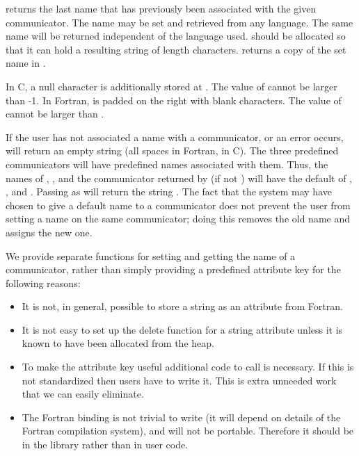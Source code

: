  returns the last name that has previously been
associated with the given communicator. The name may be set and retrieved
from any language. The same name will be returned independent of the
language used.
 should be allocated so that it can hold a resulting string
of length  characters.
returns a copy of the set name in .
 
In C, a null character is additionally stored at .
The value of  cannot be larger than
-1.
In Fortran,  is padded on the right with blank characters.
The value of  cannot be larger than
.

If the user has not associated a name with a communicator, or an error
occurs,  will return an empty string (all
spaces in Fortran,  in C). The three predefined
communicators will have predefined names associated with them.
Thus, the names of , , and
the communicator returned by 
(if not )
will have the default of , , and .
Passing  as  will return the string
.
The fact that the system may have chosen to give a default name to a
communicator does not prevent the user from setting a name on the same
communicator; doing this removes the old name and assigns the new one.

\begin{rationale}
We provide separate functions for setting and getting the name of a
communicator, rather than simply providing a predefined attribute key
for the following reasons:
\begin{itemize}

\item It is not, in general, possible to store a string as an attribute
from Fortran.

\item It is not easy to set up the delete function for a string
attribute unless it is known to have been allocated from the heap.

\item To make the attribute key useful additional code to call
 is necessary. If this is not standardized then users have
to write it. This is extra unneeded work that we can easily
eliminate.

\item The Fortran binding is not trivial to write (it will depend on
details of the Fortran compilation system), and will not be
portable. Therefore it should be in the library rather than in user
code.
\end{itemize}
\end{rationale}

